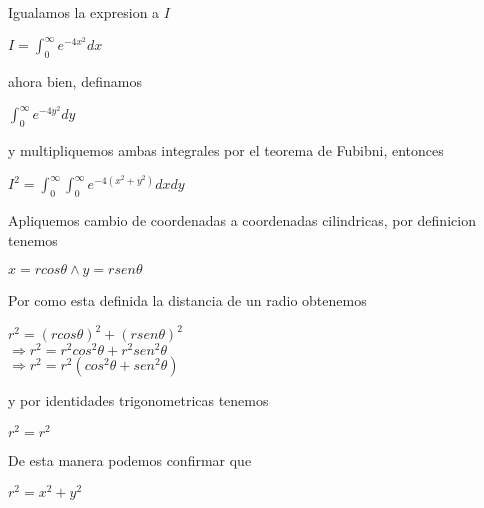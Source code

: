 Igualamos la expresion a $I$\begin{center}
    $I=\displaystyle\int_{0}^{\infty} e^{-4x^2} dx$
\end{center}
ahora bien, definamos\begin{center}
    $\displaystyle\int_{0}^{\infty} e^{-4y^2} dy$
\end{center}
y multipliquemos ambas integrales por el teorema de Fubibni, entonces\begin{center}
    $I^2 = \displaystyle\int_{0}^{\infty} \int_{0}^{\infty} e^{-4(x^2+y^2)} dxdy$
\end{center}
Apliquemos cambio de coordenadas a coordenadas cilindricas, por definicion tenemos\begin{center}
    $x = rcos\theta\wedge y = rsen\theta$
\end{center}
Por como esta definida la distancia de un radio obtenemos\begin{center}
    $r^2 = \left ( rcos\theta \right )^2 + \left ( rsen\theta \right )^2$\\
    \vspace{0.2cm}
    $\Rightarrow  r^2 = r^2cos^2\theta + r^2sen^2\theta$\\
    \vspace{0.2cm}
    $\Rightarrow r^2 = r^2\left ( cos^2\theta + sen^2\theta \right )$
\end{center}y por identidades trigonometricas tenemos\begin{center}
    $r^2 = r^2$
\end{center}
De esta manera podemos confirmar que\begin{center}
    $r^2 = x^2 + y^2$
\end{center}
